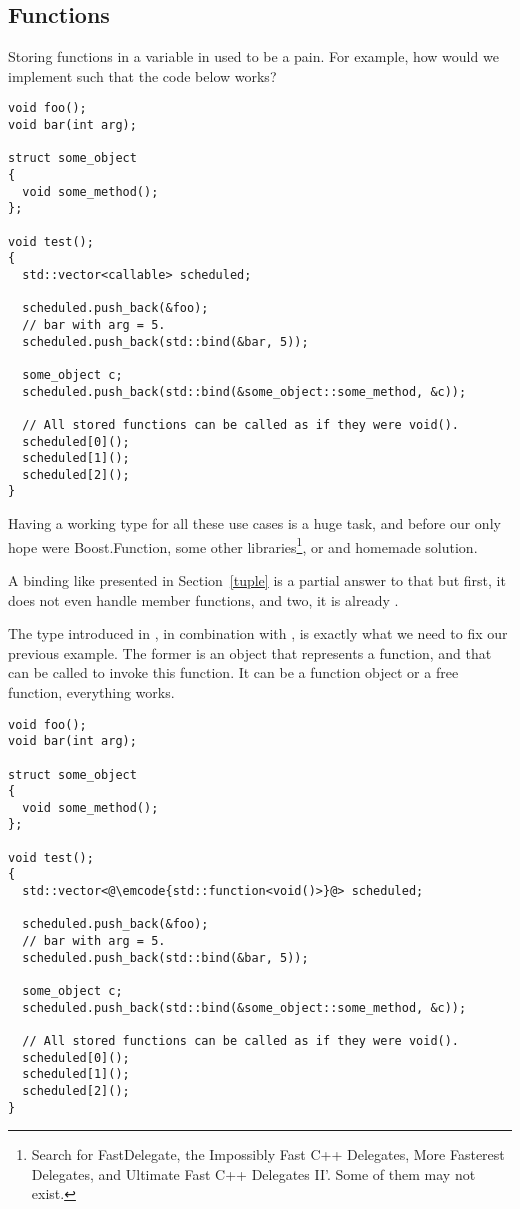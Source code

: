 \subsection{Functions}

Storing functions in a variable in \cpp{} used to be a pain. For
example, how would we implement  such that the code
below works?

\begin{lstlisting}
void foo();
void bar(int arg);

struct some_object
{
  void some_method();
};

void test();
{
  std::vector<callable> scheduled;

  scheduled.push_back(&foo);
  // bar with arg = 5.
  scheduled.push_back(std::bind(&bar, 5));

  some_object c;
  scheduled.push_back(std::bind(&some_object::some_method, &c));

  // All stored functions can be called as if they were void().
  scheduled[0]();
  scheduled[1]();
  scheduled[2]();
}
\end{lstlisting}

Having a working type for all these use cases is a huge task, and
before  our only hope were Boost.Function, some other
libraries\footnote{Search for FastDelegate, the Impossibly Fast C++
  Delegates, More Fasterest Delegates, and Ultimate Fast C++ Delegates
  II'. Some of them may not exist.}, or and homemade solution.

A binding like presented in Section~\ref{tuple} is a partial answer to
that but first, it does not even handle member functions, and two, it
is already .

\bigskip

%
%
The  type introduced in , in combination
with  , is exactly what we
need to fix our previous example. The former is an object that represents a
function, and that can be called to invoke this function. It can be a
function object or a free function, everything works.

\begin{lstlisting}
void foo();
void bar(int arg);

struct some_object
{
  void some_method();
};

void test();
{
  std::vector<@\emcode{std::function<void()>}@> scheduled;

  scheduled.push_back(&foo);
  // bar with arg = 5.
  scheduled.push_back(std::bind(&bar, 5));

  some_object c;
  scheduled.push_back(std::bind(&some_object::some_method, &c));

  // All stored functions can be called as if they were void().
  scheduled[0]();
  scheduled[1]();
  scheduled[2]();
}
\end{lstlisting}


